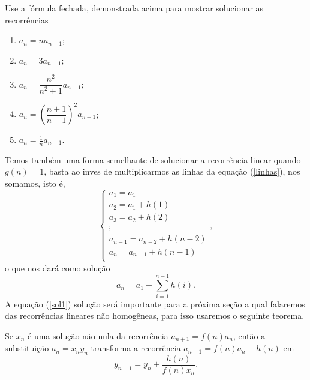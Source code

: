 	\begin{example} Use a fórmula fechada, demonstrada acima para mostrar solucionar as recorrências
	\begin{enumerate}
		\item[(a)] $a_{n} = na_{n-1} $;
		\item[(b)] $a_{n} = 3a_{n-1}$;
		\item[(c)] $a_{n} = \dfrac{n^2}{n^2+1}a_{n-1}$;
		\item[(d)] $a_{n} = \left(\dfrac{n+1}{n-1}\right)^2a_{n-1}$;
		\item[(e)] $a_{n} = \frac{1}{n}a_{n-1}$.
	\end{enumerate}

\end{example}
	\quad Temos também uma forma semelhante de solucionar a recorrência linear quando $g(n)=1$, basta ao inves de multiplicarmos as linhas da equação (\ref{linhas}), nos somamos, isto é,
	\begin{equation}
	\label{linhas2}
	\begin{cases}
	a_1 = a_1\\
	a_2 = a_1 + h(1)\\
	a_3 = a_2 + h(2)\\
	\vdots\\
	a_{n-1} = a_{n-2} + h(n-2)\\
	a_{n} = a_{n-1} + h(n-1)\\
	\end{cases},
	\end{equation}
	o que nos dará como solução 
	\begin{equation}
	\label{sol1}
		a_n = a_1 + \sum_{i=1}^{n-1}h(i).
 	\end{equation} 
 	\quad A equação (\ref{sol1}) solução será importante para a próxima seção a qual falaremos das recorrências lineares não homogêneas, para isso usaremos o seguinte teorema.
 	\begin{teo}
 	\label{solxn}
 		Se $x_n$ é uma solução não nula da recorrência $a_{n+1} = f(n)a_n$, então a substituição $a_n=x_ny_n$ transforma a recorrência $a_{n+1}=f(n)a_n + h(n)$ em
 		\begin{equation}
 		\label{formula}
 			y_{n+1} = y_n + \frac{h(n)}{f(n)x_n}.
 		\end{equation} 
 	\end{teo}
